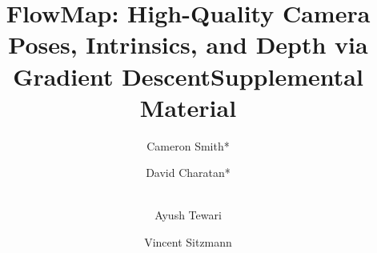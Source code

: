 \documentclass[runningheads]{llncs}
\begin{document}
\title{FlowMap: High-Quality Camera Poses, Intrinsics, and Depth via Gradient Descent}


\author{Cameron Smith* \and
David Charatan* \and \\
Ayush Tewari \and
Vincent Sitzmann}



\maketitle














\title{Supplemental Material}
\author{}
\institute{}
\maketitle
\vspace{-20pt}

\makeatletter
\renewcommand \thesection{S\@arabic\c@section}
\renewcommand\thetable{S\@arabic\c@table}
\renewcommand \thefigure{S\@arabic\c@figure}
\makeatother
\setcounter{section}{0}
\setcounter{figure}{0}
\setcounter{table}{0}






\end{document}
